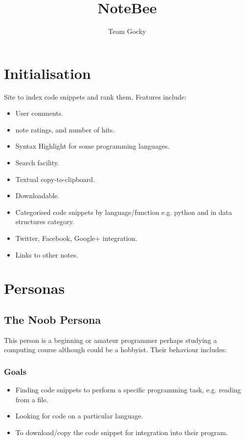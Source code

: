 \documentclass[11pt]{article}
\title{NoteBee}
\author{Team Gocky}
\begin{document}
\maketitle

\section{Initialisation}

Site to index code snippets and rank them.
Features include:

\begin{itemize}
\item User comments.
\item note ratings, and number of hits.
\item Syntax Highlight for some programming languages.
\item Search facility.
\item Textual copy-to-clipboard.
\item Downloadable.
\item Categorised code snippets by language/function e.g. python and
in data structures category.
\item Twitter, Facebook, Google+ integration.
\item Links to other notes.
\end{itemize}

\section{Personas}


\subsection{The Noob Persona}

This person is a beginning or amateur programmer perhaps studying a
computing course although could be a hobbyist. Their behaviour includes:

\subsubsection{Goals}

\begin{itemize}
\item Finding code snippets to perform a specific programming task,
e.g. reading from a file.
\item Looking for code on a particular language.
\item To download/copy the code snippet for integration into their
program.
\end{itemize}
\end{document}

